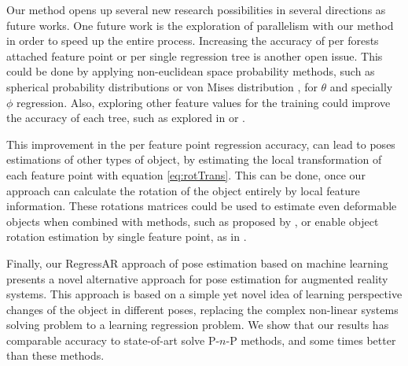 \documentclass[annual]{acmsiggraph}
\begin{document}
Our method opens up several new research possibilities in several directions as future works. One future work is the exploration of parallelism with our method in order to speed up the entire process. Increasing the accuracy of per forests attached feature point or per single regression tree is another open issue. This could be done by applying non-euclidean space probability methods, such as spherical probability distributions or von Mises distribution \cite{Abramowitz:1974}, for $\theta$ and specially $\phi$ regression. Also, exploring other feature values for the training could improve the accuracy of each tree, such as explored in \cite{Criminisi:Book} or \cite{Shotton:2013}. 

This improvement in the per feature point regression accuracy, can lead to poses estimations of other types of object, by estimating the local transformation of each feature point with equation \eqref{eq:rotTrans}. This can be done, once our approach can calculate the rotation of the object entirely by local feature information. These rotations matrices could be used to estimate even deformable objects when combined with methods, such as proposed by \cite{Rendl:2014}, or enable object rotation estimation by single feature point, as in \cite{Tokunaga:2015}. 


Finally, our RegressAR approach of pose estimation based on machine learning presents a novel alternative approach for pose estimation for augmented reality systems. This approach is based on a simple yet novel idea of learning perspective changes of the object in different poses, replacing the complex non-linear systems solving problem to a learning regression problem. We show that our results has comparable accuracy to state-of-art solve P-$n$-P methods, and some times better than these methods.  




\end{document}
